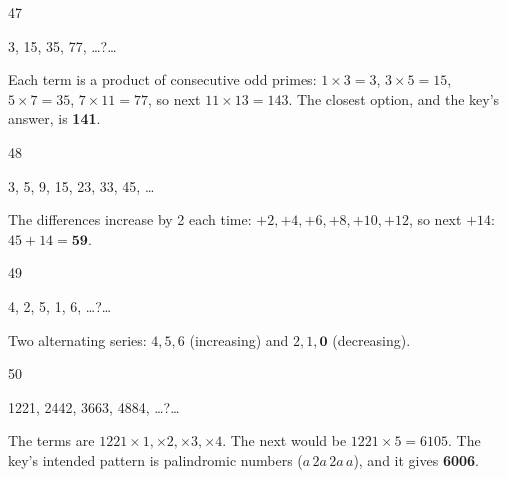 \begin{question}{47}
{3, 15, 35, 77, \ldots{}?\ldots{}\par}
\begin{explain}
Each term is a product of consecutive odd primes: $1\times3=3$, $3\times5=15$, $5\times7=35$, $7\times11=77$, so next $11\times13=143$. The closest option, and the key's answer, is \textbf{141}.
\end{explain}
\end{question}

\begin{question}{48}
{3, 5, 9, 15, 23, 33, 45, \ldots{}\par}
\begin{explain}
The differences increase by 2 each time: $+2, +4, +6, +8, +10, +12$, so next $+14$: $45+14=\mathbf{59}$.
\end{explain}
\end{question}

\begin{question}{49}
{4, 2, 5, 1, 6, \ldots{}?\ldots{}\par}
\begin{explain}
Two alternating series: $4, 5, 6$ (increasing) and $2, 1, \mathbf{0}$ (decreasing).
\end{explain}
\end{question}

\begin{question}{50}
{1221, 2442, 3663, 4884, \ldots{}?\ldots{}\par}
\begin{explain}
The terms are $1221\times1, \times2, \times3, \times4$. The next would be $1221\times5=6105$. The key's intended pattern is palindromic numbers ($a\,2a\,2a\,a$), and it gives \textbf{6006}.
\end{explain}
\end{question}
